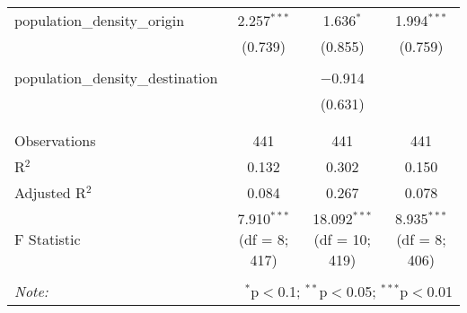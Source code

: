 \begin{table}[!htbp]
\begin{tabular}{@{\extracolsep{5pt}}lccc}
 population\_density\_origin & 2.257$^{***}$ & 1.636$^{*}$ & 1.994$^{***}$ \\ 
  & (0.739) & (0.855) & (0.759) \\ 
  & & & \\ 
 population\_density\_destination &  & $-$0.914 &  \\ 
  &  & (0.631) &  \\ 
  & & & \\ 
\hline \\[-1.8ex] 
Observations & 441 & 441 & 441 \\ 
R$^{2}$ & 0.132 & 0.302 & 0.150 \\ 
Adjusted R$^{2}$ & 0.084 & 0.267 & 0.078 \\ 
F Statistic & 7.910$^{***}$ (df = 8; 417) & 18.092$^{***}$ (df = 10; 419) & 8.935$^{***}$ (df = 8; 406) \\ 
\hline 
\hline \\[-1.8ex] 
\textit{Note:}  & \multicolumn{3}{r}{$^{*}$p$<$0.1; $^{**}$p$<$0.05; $^{***}$p$<$0.01} \\ 
\end{tabular} 
\end{table} 
